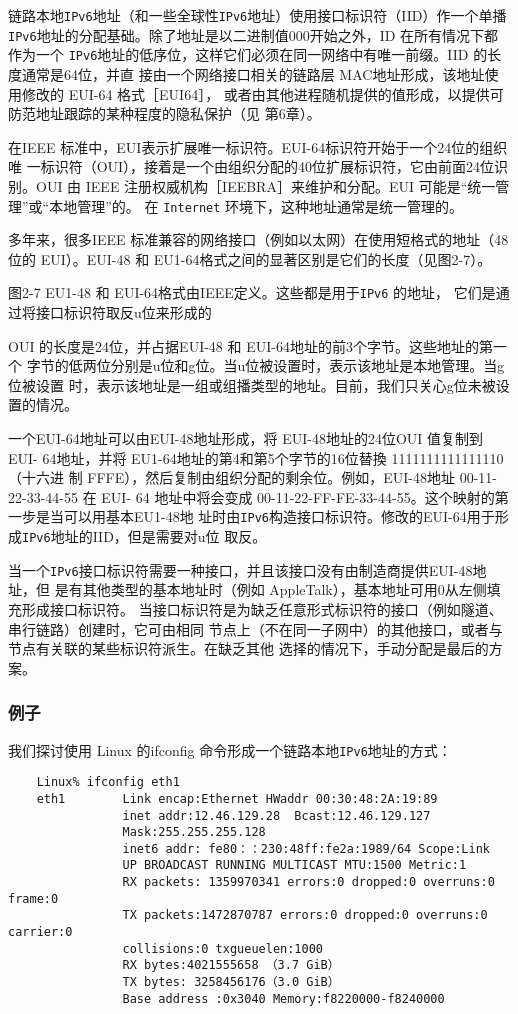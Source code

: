 链路本地\verb|IPv6|地址（和一些全球性\verb|IPv6|地址）使用接口标识符（IID）作一个单播
\verb|IPv6|地址的分配基础。除了地址是以二进制值000开始之外，ID 在所有情况下都作为一个
\verb|IPv6|地址的低序位，这样它们必须在同一网络中有唯一前缀。IID 的长度通常是64位，并直
接由一个网络接口相关的链路层 MAC地址形成，该地址使用修改的 EUI-64 格式［EUI64］，
或者由其他进程随机提供的值形成，以提供可防范地址跟踪的某种程度的隐私保护（见
第6章）。

在IEEE 标准中，EUI表示扩展唯一标识符。EUI-64标识符开始于一个24位的组织唯
一标识符（OUI），接着是一个由组织分配的40位扩展标识符，它由前面24位识别。OUI 由
IEEE 注册权威机构［IEEBRA］来维护和分配。EUI 可能是“统一管理”或“本地管理”的。
在 \verb|Internet| 环境下，这种地址通常是统一管理的。

多年来，很多IEEE 标准兼容的网络接口（例如以太网）在使用短格式的地址（48位的
EUI）。EUI-48 和 EU1-64格式之间的显著区别是它们的长度（见图2-7）。

图2-7 EU1-48 和 EUI-64格式由IEEE定义。这些都是用于\verb|IPv6| 的地址，
它们是通过将接口标识符取反u位来形成的

OUI 的长度是24位，并占据EUI-48 和 EUI-64地址的前3个字节。这些地址的第一个
字节的低两位分别是u位和g位。当u位被设置时，表示该地址是本地管理。当g位被设置
时，表示该地址是一组或组播类型的地址。目前，我们只关心g位未被设置的情况。

一个EUI-64地址可以由EUI-48地址形成，将 EUI-48地址的24位OUI 值复制到 EUI-
64地址，并将 EU1-64地址的第4和第5个字节的16位替換 1111111111111110（十六进
制 FFFE），然后复制由组织分配的剩余位。例如，EUI-48地址 00-11-22-33-44-55 在 EUI-
64 地址中将会变成 00-11-22-FF-FE-33-44-55。这个映射的第一步是当可以用基本EU1-48地
址时由\verb|IPv6|构造接口标识符。修改的EUI-64用于形成\verb|IPv6|地址的IID，但是需要对u位
取反。

当一个\verb|IPv6|接口标识符需要一种接口，并且该接口没有由制造商提供EUI-48地址，但
是有其他类型的基本地址时（例如 AppleTalk），基本地址可用0从左侧填充形成接口标识符。
当接口标识符是为缺乏任意形式标识符的接口（例如隧道、串行链路）创建时，它可由相同
节点上（不在同一子网中）的其他接口，或者与节点有关联的某些标识符派生。在缺乏其他
选择的情况下，手动分配是最后的方案。

\subsubsection{例子}
我们探讨使用 Linux 的ifconfig 命令形成一个链路本地\verb|IPv6|地址的方式：

\begin{verbatim}
    Linux% ifconfig eth1
    eth1        Link encap:Ethernet HWaddr 00:30:48:2A:19:89
                inet addr:12.46.129.28  Bcast:12.46.129.127
                Mask:255.255.255.128
                inet6 addr: fe80：：230:48ff:fe2a:1989/64 Scope:Link
                UP BROADCAST RUNNING MULTICAST MTU:1500 Metric:1
                RX packets: 1359970341 errors:0 dropped:0 overruns:0 frame:0
                TX packets:1472870787 errors:0 dropped:0 overruns:0 carrier:0
                collisions:0 txgueuelen:1000
                RX bytes:4021555658 （3.7 GiB）
                TX bytes: 3258456176（3.0 GiB）
                Base address :0x3040 Memory:f8220000-f8240000
\end{verbatim}

